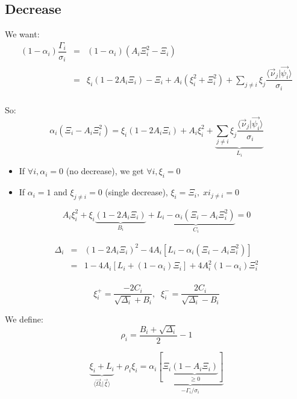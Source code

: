 \documentclass[aps,12pt]{revtex4}
\begin{document}
\subsection{Decrease}
We want:
\begin{equation}
\begin{array}{rcl}
	(1-\alpha_i) \dfrac{\Gamma_i}{\sigma_i} & = & (1-\alpha_i) \left( A_i\Xi_i^2 - \Xi_i\right) \\
	& = & \displaystyle \xi_i (1-2A_i\Xi_i) - \Xi_i + A_i (\xi_i^2 + \Xi_i^2) + \sum_{j\not=i} \xi_j \dfrac{\langle \vec{\nu}_j \vert \vec{\psi_i} \rangle}{\sigma_i}\\
\end{array}
\end{equation}

So: 
\begin{equation}
	\alpha_i\left( \Xi_i - A_i \Xi_i^2 \right) = \xi_i (1-2A_i\Xi_i) + A_i \xi_i^2 +
	\underbrace{\sum_{j\not=i} \xi_j \dfrac{\langle \vec{\nu}_j \vert \vec{\psi_i} \rangle}{\sigma_i}}_{L_i}
\end{equation}

\begin{itemize}
\item If $\forall i, \alpha_i=0$ (no decrease), we get $\forall i, \xi_i=0$
\item If $\alpha_i=1$ and $\xi_{j\not=i}=0$ (single decrease), $\xi_i=\Xi_i,\;xi_{j\not=i}=0$
\end{itemize}

\begin{equation}
A_i \xi_i^2 + \xi_i \underbrace{(1-2A_i\Xi_i)}_{B_i} + \underbrace{L_i - \alpha_i\left( \Xi_i - A_i \Xi_i^2 \right)}_{C_i} = 0
\end{equation}

\begin{equation}
\begin{array}{rcl}
	\Delta_i & = & (1-2A_i\Xi_i)^2 - 4 A_i \left[ L_i - \alpha_i\left( \Xi_i - A_i \Xi_i^2 \right)\right]\\
	  & = & 1 -4 A_i \left[L_i + (1-\alpha_i) \Xi_i\right] + 4 A_i^2 (1-\alpha_i) \Xi_i^2 \\
\end{array}
\end{equation}

\begin{equation}
	\xi_i^+ = \dfrac{-2C_i}{\sqrt{\Delta_i}+B_i}, \;\; \xi_i^- = \dfrac{2C_i}{\sqrt{\Delta_i}-B_i}
\end{equation}

We define:
\begin{equation}
	\rho_i = \dfrac{B_i + \sqrt{\Delta_i} }{2}-1
\end{equation}

\begin{equation}
	\underbrace{\xi_i + L_i}_{\langle\vec{\Omega}_i \vert \vec{\xi} \rangle} + \rho_i \xi_i =  \alpha_i \underbrace{\left[\Xi_i \underbrace{\left(1-A_i\Xi_i\right)}_{\geq0}\right]}_{-\Gamma_i/\sigma_i}
\end{equation}
\end{document}
